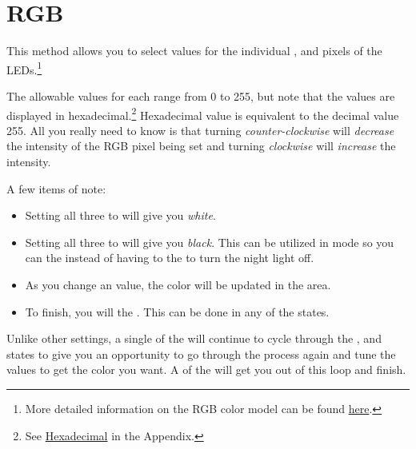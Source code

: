 \section{RGB} 

This method allows you to select values for the individual , 
and  pixels of the LEDs.\footnote{ More detailed information on the RGB
color model can be found
\href{https://en.wikipedia.org/wiki/RGB\_color\_model}{here}.}

\par\medskip

The allowable values for each range from \num{0} to \num{255}, but note that
the values are displayed in hexadecimal.\footnote{ See
\hyperref[Hexadecimal]{Hexadecimal} in the Appendix.} Hexadecimal value
 is equivalent to the decimal value \num{255}. All you really need to
know is that turning \textit{counter-clockwise} will \textit{decrease} the
intensity of the RGB pixel being set and turning \textit{clockwise} will
\textit{increase} the intensity.

\par\medskip

A few items of note:

\begin{itemize}
  \item Setting all three to  will give you \textit{white}.
  \item Setting all three to  will give you \textit{black}.  This can
    be utilized in  mode so you can  the  instead of having
    to  the  to turn the night light off.
  \item As you change an  value, the color will be updated in the
     area.
  \item To finish, you will  the .  This can be done in any of the
     states.
\end{itemize}

Unlike other settings, a single  of the  will continue to cycle
through the ,  and  states to give you an opportunity
to go through the process again and tune the values to get the color you want.  A
 of the  will get you out of this loop and finish.

\par\medskip

